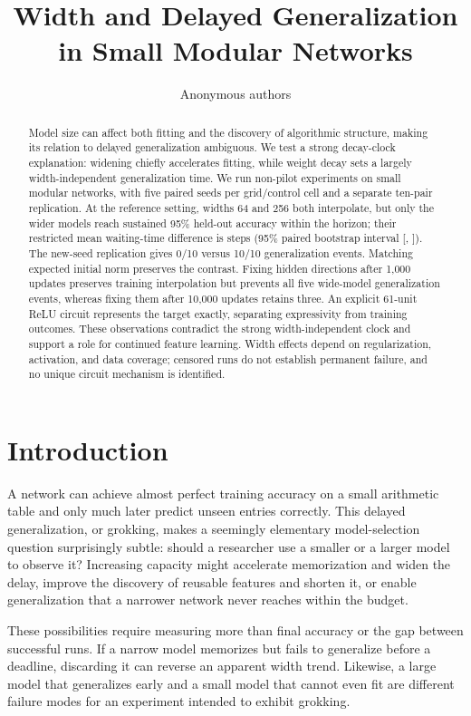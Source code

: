 \documentclass{article}
\title{Width and Delayed Generalization\\in Small Modular Networks}
\author{Anonymous authors}
\begin{document}
\maketitle
\begin{abstract}
Model size can affect both fitting and the discovery of algorithmic structure, making its relation to delayed generalization ambiguous. We test a strong decay-clock explanation: widening chiefly accelerates fitting, while weight decay sets a largely width-independent generalization time. We run \RunCount{} non-pilot experiments on small modular networks, with five paired seeds per grid/control cell and a separate ten-pair replication. At the reference setting, widths 64 and 256 both interpolate, but only the wider models reach sustained 95\% held-out accuracy within the horizon; their restricted mean waiting-time difference is \PrimaryDiff{} steps (95\% paired bootstrap interval [\PrimaryLow{}, \PrimaryHigh{}]). The new-seed replication gives 0/10 versus 10/10 generalization events. Matching expected initial norm preserves the contrast. Fixing hidden directions after 1,000 updates preserves training interpolation but prevents all five wide-model generalization events, whereas fixing them after 10,000 updates retains three. An explicit 61-unit ReLU circuit represents the target exactly, separating expressivity from training outcomes. These observations contradict the strong width-independent clock and support a role for continued feature learning. Width effects depend on regularization, activation, and data coverage; censored runs do not establish permanent failure, and no unique circuit mechanism is identified.
\end{abstract}

\section{Introduction}
A network can achieve almost perfect training accuracy on a small arithmetic table and only much later predict unseen entries correctly. This delayed generalization, or grokking, makes a seemingly elementary model-selection question surprisingly subtle: should a researcher use a smaller or a larger model to observe it? Increasing capacity might accelerate memorization and widen the delay, improve the discovery of reusable features and shorten it, or enable generalization that a narrower network never reaches within the budget.

These possibilities require measuring more than final accuracy or the gap between successful runs. If a narrow model memorizes but fails to generalize before a deadline, discarding it can reverse an apparent width trend. Likewise, a large model that generalizes early and a small model that cannot even fit are different failure modes for an experiment intended to exhibit grokking.
\end{document}
